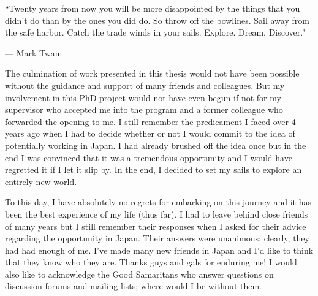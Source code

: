 \epigraph{``Twenty years from now you will be more disappointed by the things that you didn't do than by the ones you did do. So throw off the bowlines. Sail away from the safe harbor. Catch the trade winds in your sails. Explore. Dream. Discover."}{--- \textup{Mark Twain}}

The culmination of work presented in this thesis would not have been possible without the guidance and support of many friends and colleagues. But my involvement in this PhD project would not have even begun if not for my supervisor who accepted me into the program and a former colleague who forwarded the opening to me. I still remember the predicament I faced over 4 years ago when I had to decide whether or not I would commit to the idea of potentially working in Japan. I had already brushed off the idea once but in the end I was convinced that it was a tremendous opportunity and I would have regretted it if I let it slip by. In the end, I decided to set my sails to explore an entirely new world.

To this day, I have absolutely no regrets for embarking on this journey and it has been the best experience of my life (thus far). I had to leave behind close friends of many years but I still remember their responses when I asked for their advice regarding the opportunity in Japan. Their answers were unanimous; clearly, they had had enough of me. I've made many new friends in Japan and I'd like to think that they know who they are. Thanks guys and gals for enduring me! I would also like to acknowledge the Good Samaritans who answer questions on discussion forums and mailing lists; where would I be without them.
